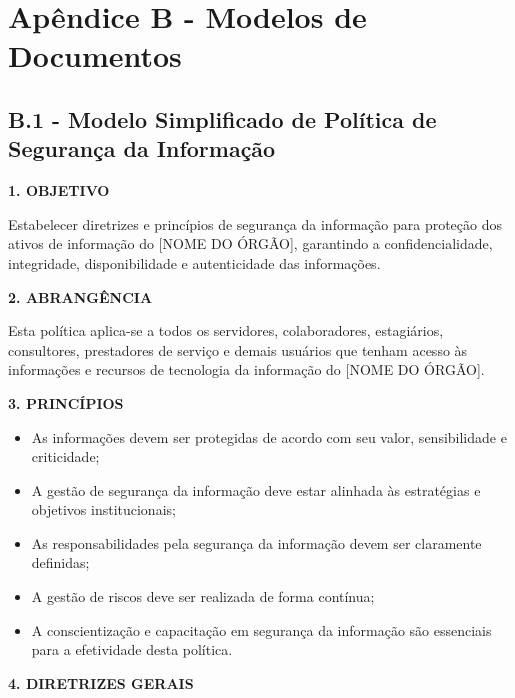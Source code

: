 \documentclass[12pt,a4paper]{report}
\begin{document}
\section{Apêndice B - Modelos de Documentos}

\subsection{B.1 - Modelo Simplificado de Política de Segurança da Informação}

\begin{tcolorbox}[colback=boxcolor,colframe=sectioncolor,arc=2mm,title=\textbf{POLÍTICA DE SEGURANÇA DA INFORMAÇÃO}]

\textbf{1. OBJETIVO}

Estabelecer diretrizes e princípios de segurança da informação para proteção dos ativos de informação do [NOME DO ÓRGÃO], garantindo a confidencialidade, integridade, disponibilidade e autenticidade das informações.

\textbf{2. ABRANGÊNCIA}

Esta política aplica-se a todos os servidores, colaboradores, estagiários, consultores, prestadores de serviço e demais usuários que tenham acesso às informações e recursos de tecnologia da informação do [NOME DO ÓRGÃO].

\textbf{3. PRINCÍPIOS}

\begin{itemize}
  \item As informações devem ser protegidas de acordo com seu valor, sensibilidade e criticidade;
  \item A gestão de segurança da informação deve estar alinhada às estratégias e objetivos institucionais;
  \item As responsabilidades pela segurança da informação devem ser claramente definidas;
  \item A gestão de riscos deve ser realizada de forma contínua;
  \item A conscientização e capacitação em segurança da informação são essenciais para a efetividade desta política.
\end{itemize}

\textbf{4. DIRETRIZES GERAIS}


\end{tcolorbox}
\end{document}
